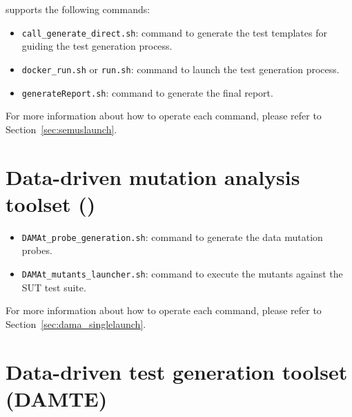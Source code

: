 {\SEMUS supports the following commands:
	\begin{itemize}
	\item \texttt{call\_generate\_direct.sh}: command to generate the test templates for guiding the test generation process.
	\item \texttt{docker\_run.sh} or \texttt{run.sh}: command to launch the test generation process.
	\item \texttt{generateReport.sh}: command to generate the final \SEMUS report.
\end{itemize}

For more information about how to operate each command, please refer to Section~\ref{sec:semuslaunch}.

\section{Data-driven mutation analysis toolset (\DAMA)}
\begin{itemize}
\item \texttt{DAMAt\_probe\_generation.sh}: command to generate the data mutation probes.
\item \texttt{DAMAt\_mutants\_launcher.sh}: command to execute the mutants against the SUT test suite.
\end{itemize}

For more information about how to operate each command, please refer to Section~\ref{sec:dama_singlelaunch}.

\section{Data-driven test generation toolset (DAMTE)}
}

